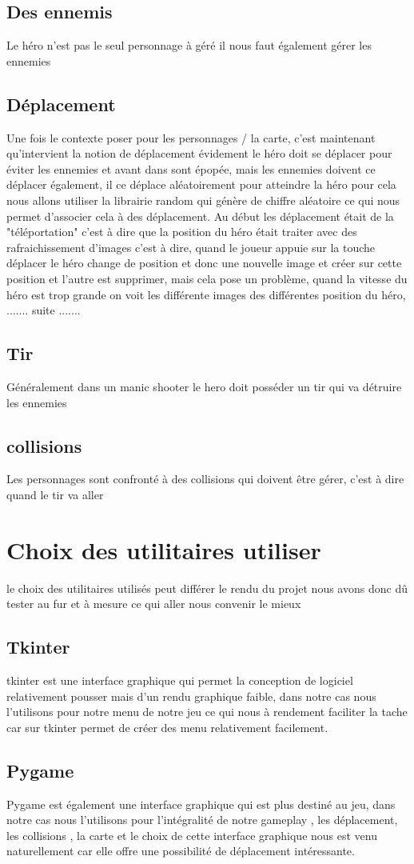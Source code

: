 \documentclass[a4paper, 11pt]{article}
\begin{document}
	\subsection{Des ennemis}
Le héro n'est pas le seul personnage à géré il nous faut également gérer les ennemies
	\subsection{Déplacement}
Une fois le contexte poser pour les personnages / la carte, c'est maintenant qu'intervient la notion de déplacement évidement le héro doit se déplacer pour éviter les ennemies et avant dans sont épopée, mais les ennemies doivent ce déplacer également, il ce déplace aléatoirement pour atteindre la héro pour cela nous allons utiliser la librairie random qui génère de chiffre aléatoire ce qui nous permet d'associer cela à des déplacement.
Au début les déplacement était de la "téléportation" c'est à dire que la position du héro était traiter avec des rafraichissement d'images c'est à dire, quand le joueur appuie sur la touche déplacer le héro change de position et donc une nouvelle image et créer sur cette position et l'autre est supprimer, mais cela pose un problème, quand la vitesse du héro est trop grande on voit les différente images des différentes position du héro, ....... suite .......
	
	\subsection{Tir}
Généralement dans un manic shooter le hero doit posséder un tir qui va détruire les ennemies 
	\subsection{collisions}
Les personnages sont confronté à des collisions qui doivent être gérer, c'est à dire quand le tir va aller
\section{Choix des utilitaires utiliser}

le choix des utilitaires utilisés peut différer le rendu du projet nous avons donc dû tester au fur et à mesure ce qui aller nous convenir le mieux

\subsection{Tkinter}
tkinter est une interface graphique qui permet la conception de logiciel relativement pousser mais d'un rendu graphique faible, dans notre cas nous l'utilisons pour notre menu de notre jeu ce qui nous à rendement faciliter la tache car sur tkinter permet de créer des menu relativement facilement.
\subsection{Pygame}
Pygame est également une interface graphique qui est plus destiné au jeu,
dans notre cas nous l'utilisons pour l'intégralité de notre gameplay , les déplacement, les collisions , la carte et le choix de cette interface graphique nous est venu naturellement car elle offre une possibilité de déplacement intéressante.
\end{document}
